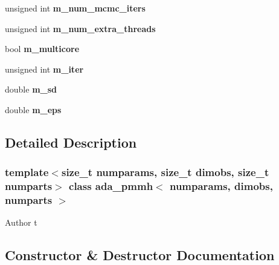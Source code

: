\begin{DoxyCompactItemize}
unsigned int {\bfseries m\+\_\+num\+\_\+mcmc\+\_\+iters}
\item 
\mbox{\label{classada__pmmh_a17938a6b9f5e737de9d93b9c82583597}} 
unsigned int {\bfseries m\+\_\+num\+\_\+extra\+\_\+threads}
\item 
\mbox{\label{classada__pmmh_a4e7a7f0ef7a203002c8585c7135e753d}} 
bool {\bfseries m\+\_\+multicore}
\item 
\mbox{\label{classada__pmmh_a271d36e458c9067e518d31f27f6fe493}} 
unsigned int {\bfseries m\+\_\+iter}
\item 
\mbox{\label{classada__pmmh_ac19f1f8da164c84937d890026729035e}} 
double {\bfseries m\+\_\+sd}
\item 
\mbox{\label{classada__pmmh_ac50a7d1c54985b3468b5384a33e321ef}} 
double {\bfseries m\+\_\+eps}
\end{DoxyCompactItemize}


\subsection{Detailed Description}
\subsubsection*{template$<$size\+\_\+t numparams, size\+\_\+t dimobs, size\+\_\+t numparts$>$\newline
class ada\+\_\+pmmh$<$ numparams, dimobs, numparts $>$}

\begin{DoxyAuthor}{Author}
t 
\end{DoxyAuthor}


\subsection{Constructor \& Destructor Documentation}
\mbox{\label{classada__pmmh_a9e8c52947fd34c7d75f3397d64f586e4}} 
